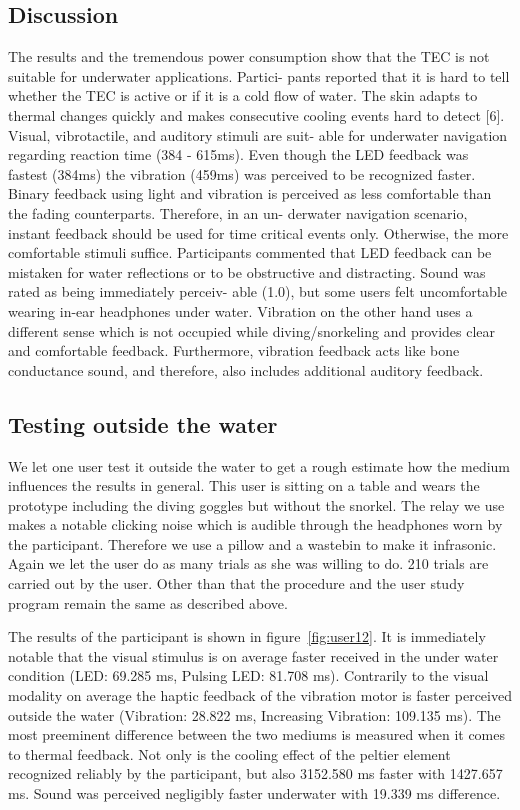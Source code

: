 \subsection{Discussion}
The results and the tremendous power consumption show that the TEC is not suitable for underwater applications. 
Partici- pants reported that it is hard to tell whether the TEC is active or if it is a cold flow of water. 
The skin adapts to thermal changes quickly and makes consecutive cooling events hard to detect [6]. 
Visual, vibrotactile, and auditory stimuli are suit- able for underwater navigation regarding reaction time (384 - 615ms). 
Even though the LED feedback was fastest (384ms) the vibration (459ms) was perceived to be recognized faster. 
Binary feedback using light and vibration is perceived as less comfortable than the fading counterparts. 
Therefore, in an un- derwater navigation scenario, instant feedback should be used for time critical events only. 
Otherwise, the more comfortable stimuli suffice. 
Participants commented that LED feedback can be mistaken for water reflections or to be obstructive and distracting. 
Sound was rated as being immediately perceiv- able (1.0), but some users felt uncomfortable wearing in-ear headphones under water. 
Vibration on the other hand uses a different sense which is not occupied while diving/snorkeling and provides clear and comfortable feedback. 
Furthermore, vibration feedback acts like bone conductance sound, and therefore, also includes additional auditory feedback.

\subsection{Testing outside the water}

We let one user test it outside the water to get a rough estimate how the medium influences the results in general.
This user is sitting on a table and wears the prototype including the diving goggles but without the snorkel.
The relay we use makes a notable clicking noise which is audible through the headphones worn by the participant.
Therefore we use a pillow and a wastebin to make it infrasonic.
Again we let the user do as many trials as she was willing to do.
210 trials are carried out by the user.
Other than that the procedure and the user study program remain the same as described above.

The results of the participant is shown in figure~\ref{fig:user12}.
It is immediately notable that the visual stimulus is on average faster received in the under water condition (LED: 69.285 ms, Pulsing LED: 81.708 ms).
Contrarily to the visual modality on average the haptic feedback of the vibration motor is faster perceived outside the water (Vibration: 28.822 ms, Increasing Vibration: 109.135 ms).
The most preeminent difference between the two mediums is measured when it comes to thermal feedback.
Not only is the cooling effect of the peltier element recognized reliably by the participant, but also 3152.580 ms faster with 1427.657 ms.
Sound was perceived negligibly faster underwater with 19.339 ms difference.

